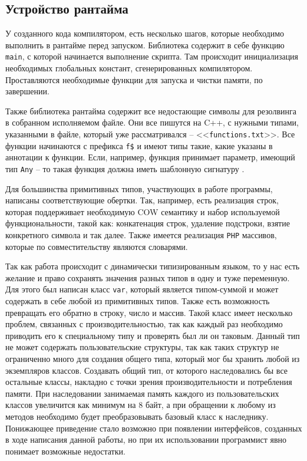 \subsection{Устройство рантайма}
\label{sec2:runtime_principle}
У созданного кода компилятором, есть несколько шагов, которые необходимо выполнить в рантайме перед запуском.
Библиотека содержит в себе функцию \verb|main|, с которой начинается выполнение скрипта.
Там происходит инициализация необходимых глобальных констант, сгенерированных компилятором.
Проставляются необходимые функции для запуска и чистки памяти, по завершении.

Также библиотека рантайма содержит все недостающие символы для резолвинга в собранном исполняемом файле.
Они все пишутся на C++, с нужными типами, указанными в файле, который уже рассматривался -- <<\verb|functions.txt|>>.
Все функции начинаются с префикса \verb|f$| и имеют типы такие, какие указаны в аннотации к функции.
Если, например, функция принимает параметр, имеющий тип \verb|Any| -- то такая функция должна иметь шаблонную сигнатуру \cite[с.~665]{Stroustrup}.

Для большинства примитивных типов, участвующих в работе программы, написаны соответствующие обертки.
Так, например, есть реализация строк, которая поддерживает необходимую COW \cite{COW} семантику и набор используемой функциональности, такой как: конкатенация строк, удаление подстроки, взятие конкретного символа и так далее.
Также имеется реализация \verb|PHP| массивов, которые по совместительству являются словарями.

Так как работа происходит с динамически типизированным языком, то у нас есть желание и право сохранять значения разных типов в одну и туже переменную.
Для этого был написан класс \verb|var|, который является типом-суммой и может содержать в себе любой из примитивных типов.
Также есть возможность превращать его обратно в строку, число и массив.
Такой класс имеет несколько проблем, связанных с производительностью, так как каждый раз необходимо приводить его к специальному типу и проверять был ли он таковым.
Данный тип не может содержать пользовательские структуры, так как таких структур не ограниченно много для создания общего типа, который мог бы хранить любой из экземпляров классов.
Создавать общий тип, от которого наследовались бы все остальные классы, накладно с точки зрения производительности и потребления памяти.
При наследовании занимаемая память каждого из пользовательских классов увеличится как минимум на 8 байт, а при обращении к любому из методов необходимо будет преобразовывать базовый класс к наследнику.
Понижающее приведение стало возможно при появлении интерфейсов, созданных в ходе написания данной работы, но при их использовании программист явно понимает возможные недостатки.

